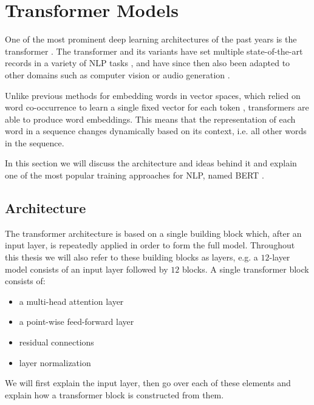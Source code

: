\section{Transformer Models}
\label{sec:transformer}
One of the most prominent deep learning architectures of the past years is the transformer \cite{vaswani2017attention}. The transformer and its variants have set multiple state-of-the-art records in a variety of NLP tasks \cite{devlin-etal-2019-bert, DBLP:journals/corr/abs-1907-11692, DBLP:journals/corr/abs-2003-10555, DBLP:journals/corr/abs-1909-08053, DBLP:journals/corr/abs-2005-14165}, and have since then also been adapted to other domains such as computer vision \cite{DBLP:journals/corr/abs-2010-11929} or audio generation \cite{https://doi.org/10.48550/arxiv.2005.00341}.

Unlike previous methods for embedding words in vector spaces, which relied on word co-occurrence to learn a single fixed vector for each token \cite{pennington2014glove, DBLP:journals/corr/abs-1301-3781}, transformers are able to produce  word embeddings. This means that the representation of each word in a sequence changes dynamically based on its context, i.e. all other words in the sequence.

In this section we will discuss the architecture and ideas behind it and explain one of the most popular training approaches for NLP, named BERT \cite{devlin-etal-2019-bert}.

\subsection{Architecture}
The transformer architecture is based on a single building block which, after an input layer, is repeatedly applied in order to form the full model. Throughout this thesis we will also refer to these building blocks as layers, e.g. a $12$-layer model consists of an input layer followed by $12$ blocks. A single transformer block consists of:
\begin{itemize}
    \item a multi-head attention layer
    \item a point-wise feed-forward layer
    \item residual connections
    \item layer normalization
\end{itemize}
We will first explain the input layer, then go over each of these elements and explain how a transformer block is constructed from them.


